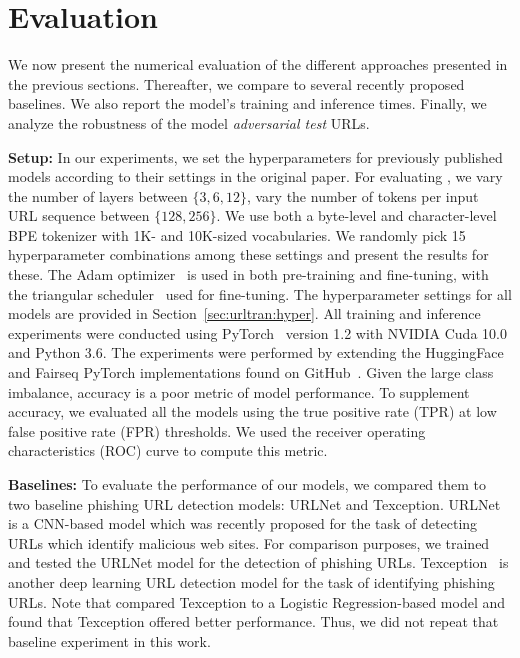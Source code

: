 \section{Evaluation}
\label{sec:urltran:eval}
%
We now present the numerical evaluation of the different approaches presented in the previous sections.
Thereafter, we compare \URLTranSys to several recently proposed baselines.
We also report the model's training and inference times.
Finally, we analyze the robustness of the model \textit{adversarial test}  URLs.


\noindent\textbf{Setup:}
In our experiments, we set the hyperparameters for previously published models according to their settings in the original paper.
For evaluating \URLTranSysc, we vary the number of layers between $\{3, 6, 12\}$, vary the number of tokens per input URL sequence between $\{128, 256\}$.
We use both a byte-level and character-level BPE tokenizer with 1K- and 10K-sized vocabularies.
We randomly pick 15 hyperparameter combinations among these settings and present the results for these.
The Adam optimizer~\citep{kingma2014adam} is used in both pre-training and fine-tuning, with the triangular scheduler~\citep{smith2017cyclical} used for fine-tuning.
The hyperparameter settings for all models are provided in Section~\ref{sec:urltran:hyper}.
All training and inference experiments were conducted using PyTorch~\citep{pytorch} version 1.2 with NVIDIA Cuda 10.0 and Python 3.6.
The experiments were performed by extending the HuggingFace and Fairseq PyTorch implementations found on GitHub~\citep{huggingface,fairseq}.
Given the large class imbalance, accuracy is a poor metric of model performance.
To supplement accuracy, we evaluated all the models using the true positive rate (TPR) at low false positive rate (FPR) thresholds. 
We used the receiver operating characteristics (ROC) curve to compute this metric.


\noindent\textbf{Baselines:}
To evaluate the performance of our models, we compared them to two baseline phishing URL detection models: URLNet and Texception. URLNet~\citep{le2018malicious} is a CNN-based model which was recently proposed for the task of detecting URLs which identify malicious web sites. 
For comparison purposes, we trained and tested the URLNet model for the detection of phishing URLs.
Texception~\citep{tajaddodianfar2020texception} is another deep learning URL detection model for the task of identifying phishing URLs. 
Note that \citet{tajaddodianfar2020texception} compared Texception to a Logistic Regression-based model and found that Texception offered better performance.
Thus, we did not repeat that baseline experiment in this work.

